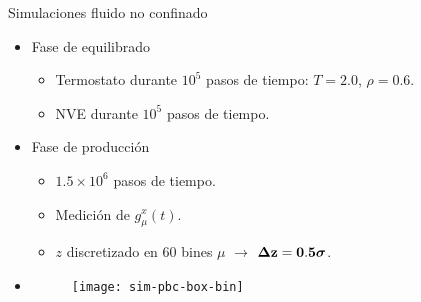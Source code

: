 \documentclass{beamer}
\begin{document}
\begin{frame}{Simulaciones fluido no confinado}
   \begin{itemize}
     \item<1-> Fase de \alert{equilibrado}
       \begin{itemize}
         \item Termostato durante $10^5$ pasos de tiempo: $T=2.0$, $\rho=0.6$.
         \item NVE durante $10^5$ pasos de tiempo.
          \end{itemize}
        \item<2-> Fase de \alert{producción}
       \begin{itemize}
         \item $1.5\times10^6$ pasos de tiempo.
         \item Medición de $g_{\mu}^x(t)$.
         \item $z$ discretizado en $60$ bines $\mu$ $\rightarrow$ {$\boldsymbol{\Delta} {\bf z=0.5}\boldsymbol{\sigma}$}.
         \end{itemize}
       \item<2->[]\begin{figure}
    \texttt{[image: sim-pbc-box-bin]}
  \end{figure}
     \end{itemize}
 \end{frame}

\end{document}
